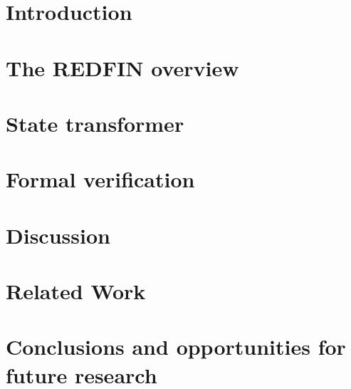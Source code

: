 \documentclass[sigplan,10pt,review,anonymous]{acmart}
\begin{document}
\section{Introduction}



\section{The REDFIN overview\label{sec-redfin}}



\section{State transformer\label{sec-transformer}}



\section{Formal verification\label{sec-verification}}



\section{Discussion\label{sec-discussion}}


\section{Related Work\label{sec-related}}


\section{Conclusions and opportunities for future research\label{sec-future}}



\end{document}
